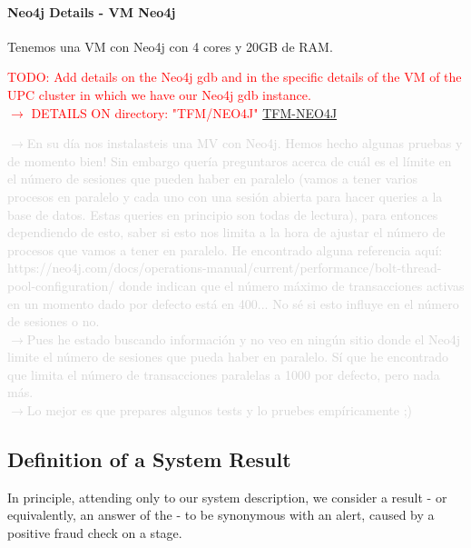\paragraph*{Neo4j Details - VM Neo4j}

Tenemos una VM con Neo4j con 4 cores y 20GB de RAM.

\textcolor{red}{TODO: Add details on the Neo4j gdb and in the specific details of the VM of the UPC cluster in which we have our Neo4j gdb instance. \\
$\rightarrow$ DETAILS ON directory: "TFM/NEO4J" \href{https://github.com/FCanfran/TFM-Neo4j}{TFM-NEO4J}}

\textcolor{lightgray}{
$\rightarrow$En su día nos instalasteis una MV con Neo4j. Hemos hecho algunas pruebas y de momento bien!
Sin embargo quería preguntaros acerca de cuál es el límite en el número de sesiones que pueden haber en paralelo  (vamos a tener varios procesos en paralelo y cada uno con una sesión abierta para hacer queries a la base de datos. Estas queries en principio son todas de lectura), para entonces dependiendo de esto, saber si esto nos limita a la hora de ajustar el número de procesos que vamos a tener en paralelo.
He encontrado alguna referencia aquí:
https://neo4j.com/docs/operations-manual/current/performance/bolt-thread-pool-configuration/
donde indican que el número máximo de transacciones activas en un momento dado por defecto está en 400... No sé si esto influye en el número de sesiones o no.\\ $\rightarrow$Pues he estado buscando información y no veo en ningún sitio donde el Neo4j limite el número de sesiones que pueda haber en paralelo. Sí que he encontrado que limita el número de transacciones paralelas a 1000 por defecto, pero nada más.\\ $\rightarrow$Lo mejor es que prepares algunos tests y lo pruebes empíricamente ;)
}

\subsection{Definition of a System Result}\label{exps:results-definition}

In principle, attending only to our system description, we consider a result - or equivalently, an answer of the \DPATM - to be synonymous with an alert, caused by a positive fraud check on a \filter stage.\\

